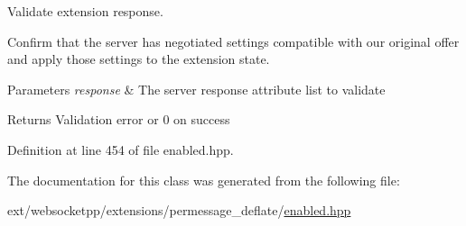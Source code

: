 Validate extension response. 

Confirm that the server has negotiated settings compatible with our original offer and apply those settings to the extension state.


\begin{DoxyParams}{Parameters}
{\em response} & The server response attribute list to validate \\
\hline
\end{DoxyParams}
\begin{DoxyReturn}{Returns}
Validation error or 0 on success 
\end{DoxyReturn}


Definition at line 454 of file enabled.\+hpp.



The documentation for this class was generated from the following file\+:\begin{DoxyCompactItemize}
\item 
ext/websocketpp/extensions/permessage\+\_\+deflate/\hyperlink{enabled_8hpp}{enabled.\+hpp}\end{DoxyCompactItemize}
